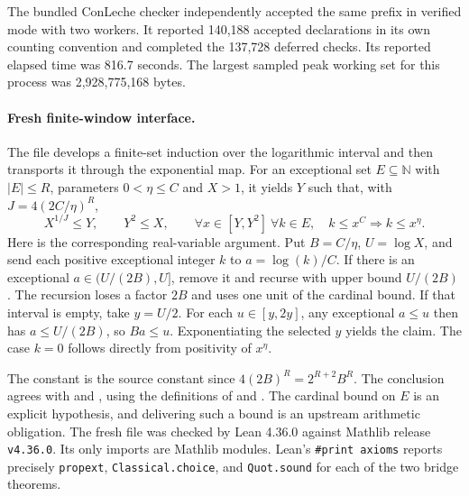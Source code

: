 The bundled ConLeche checker independently accepted the same prefix in verified mode with two workers. It reported 140,188 accepted declarations in its own counting convention and completed the 137,728 deferred checks. Its reported elapsed time was 816.7 seconds. The largest sampled peak working set for this process was 2,928,775,168 bytes.

\paragraph{Fresh finite-window interface.}
The file  develops a finite-set induction over the logarithmic interval and then transports it through the exponential map. For an exceptional set $E\subseteq\mathbb N$ with $|E|\le R$, parameters $0<\eta\le C$ and $X>1$, it yields $Y$ such that, with $J=4(2C/\eta)^R$,
\[
 X^{1/J}\le Y,\qquad Y^2\le X,\qquad
 \forall x\in[Y,Y^2]\ \forall k\in E,\quad k\le x^C\Longrightarrow k\le x^\eta.
\]
Here is the corresponding real-variable argument. Put $B=C/\eta$, $U=\log X$, and send each positive exceptional integer $k$ to $a=\log(k)/C$. If there is an exceptional $a\in(U/(2B),U]$, remove it and recurse with upper bound $U/(2B)$. The recursion loses a factor $2B$ and uses one unit of the cardinal bound. If that interval is empty, take $y=U/2$. For each $u\in[y,2y]$, any exceptional $a\le u$ then has $a\le U/(2B)$, so $Ba\le u$. Exponentiating the selected $y$ yields the claim. The case $k=0$ follows directly from positivity of $x^\eta$.

The constant is the source constant since $4(2B)^R=2^{R+2}B^R$. The conclusion agrees with  and , using the definitions of  and . The cardinal bound on $E$ is an explicit hypothesis, and delivering such a bound is an upstream arithmetic obligation. The fresh file was checked by Lean 4.36.0 against Mathlib release \texttt{v4.36.0}. Its only imports are Mathlib modules. Lean's \texttt{\#print axioms} reports precisely \texttt{propext}, \texttt{Classical.choice}, and \texttt{Quot.sound} for each of the two bridge theorems.
